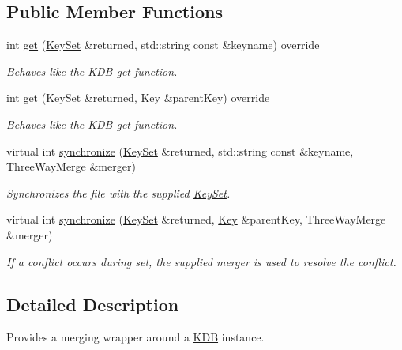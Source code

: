 \subsection*{Public Member Functions}
\begin{DoxyCompactItemize}
\item 
int \hyperlink{classkdb_1_1tools_1_1merging_1_1MergingKDB_a0d2a28f24aeb6ba3e81af73ef8b98df7}{get} (\hyperlink{classkdb_1_1KeySet}{Key\+Set} \&returned, std\+::string const \&keyname) override
\begin{DoxyCompactList}\small\item\em Behaves like the \hyperlink{classkdb_1_1KDB}{K\+DB} get function. \end{DoxyCompactList}\item 
int \hyperlink{classkdb_1_1tools_1_1merging_1_1MergingKDB_a062b1dac733aa3999691f8d70635b09c}{get} (\hyperlink{classkdb_1_1KeySet}{Key\+Set} \&returned, \hyperlink{classkdb_1_1Key}{Key} \&parent\+Key) override
\begin{DoxyCompactList}\small\item\em Behaves like the \hyperlink{classkdb_1_1KDB}{K\+DB} get function. \end{DoxyCompactList}\item 
virtual int \hyperlink{classkdb_1_1tools_1_1merging_1_1MergingKDB_ae7fb5bd354d16ed90bbf0c4c087b5d6f}{synchronize} (\hyperlink{classkdb_1_1KeySet}{Key\+Set} \&returned, std\+::string const \&keyname, Three\+Way\+Merge \&merger)
\begin{DoxyCompactList}\small\item\em Synchronizes the file with the supplied \hyperlink{classkdb_1_1KeySet}{Key\+Set}. \end{DoxyCompactList}\item 
virtual int \hyperlink{classkdb_1_1tools_1_1merging_1_1MergingKDB_adcb436c4bf35c89c67ae2f5b3f1a9cfd}{synchronize} (\hyperlink{classkdb_1_1KeySet}{Key\+Set} \&returned, \hyperlink{classkdb_1_1Key}{Key} \&parent\+Key, Three\+Way\+Merge \&merger)
\begin{DoxyCompactList}\small\item\em If a conflict occurs during set, the supplied merger is used to resolve the conflict. \end{DoxyCompactList}\end{DoxyCompactItemize}


\subsection{Detailed Description}
Provides a merging wrapper around a \hyperlink{classkdb_1_1KDB}{K\+DB} instance. 

